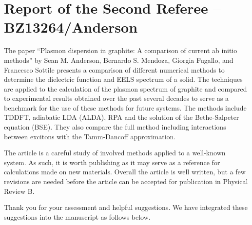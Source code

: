 \documentclass[aps,prb,10pt,endfloats]{revtex4-1}
\begin{document}

\section{Report of the Second Referee -- BZ13264/Anderson}

The paper ``Plasmon dispersion in graphite: A comparison of current ab initio
methods'' by Sean M. Anderson, Bernardo S. Mendoza, Giorgia Fugallo, and
Francesco Sottile presents a comparison of different numerical methods to
determine the dielectric function and EELS spectrum of a solid. The techniques
are applied to the calculation of the plasmon spectrum of graphite and compared
to experimental results obtained over the past several decades to serve as a
benchmark for the use of these methods for future systems. The methods include
TDDFT, adiabatic LDA (ALDA), RPA and the solution of the Bethe-Salpeter equation
(BSE). They also compare the full method including interactions between excitons
with the Tamm-Dancoff approximation.

The article is a careful study of involved methods applied to a well-known
system. As such, it is worth publishing as it may serve as a reference for
calculations made on new materials. Overall the article is well written, but a
few revisions are needed before the article can be accepted for publication in
Physical Review B.
\begin{shaded*}
Thank you for your assessment and helpful suggestions. We have integrated these
suggestions into the manuscript as follows below.
\end{shaded*}
\end{document}
